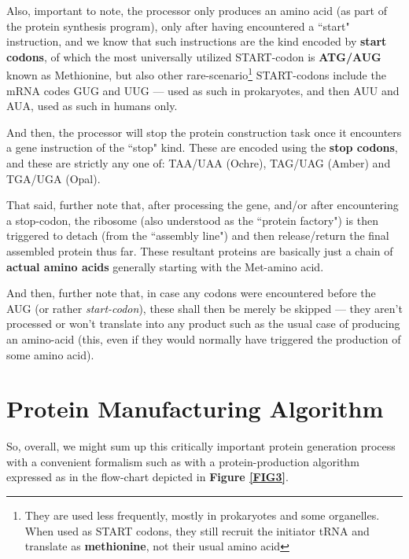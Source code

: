 \documentclass[a4paper, 18pt]{book} %
\begin{document}
Also, important to note, the processor only produces an amino acid (as part of the protein synthesis program), only after having encountered a ``start" instruction, and we know that such instructions are the kind encoded by \textbf{start codons}, of which the most universally utilized START-codon is \textbf{ATG/AUG} known as Methionine, but also other rare-scenario\footnote{They are used less frequently, mostly in prokaryotes and some organelles. When used as START codons, they still recruit the initiator tRNA and translate as \textbf{methionine}, not their usual amino acid\cite{copilot_dna_assistant}} START-codons include the mRNA codes GUG and UUG --- used as such in prokaryotes, and then AUU and AUA, used as such in humans only. 

And then, the processor will stop the protein construction task once it encounters a gene instruction of the ``stop" kind. These are encoded using the \textbf{stop codons}, and these are strictly any one of: TAA/UAA (Ochre), TAG/UAG (Amber) and TGA/UGA (Opal)\cite{newsmedical2025startcodons}.

That said, further note that, after processing the gene, and/or after encountering a stop-codon, the ribosome (also understood as the ``protein factory") is then triggered to detach (from the ``assembly line") and then release/return the final assembled protein thus far. These resultant proteins are basically just a chain of \textbf{actual amino acids} generally starting with the Met-amino acid.

And then, further note that, in case any codons were encountered before the AUG (or rather \textit{start-codon}), these shall then be merely be skipped --- they aren't processed or won't translate into any product such as the usual case of producing an amino-acid (this, even if they would normally have triggered the production of some amino acid). 

\section{Protein Manufacturing Algorithm}
\label{SECPROT}

So, overall, we might sum up this critically important protein generation process with a convenient formalism such as with a protein-production algorithm expressed as in the flow-chart depicted in \textbf{Figure \ref{FIG3}}.
\end{document}
